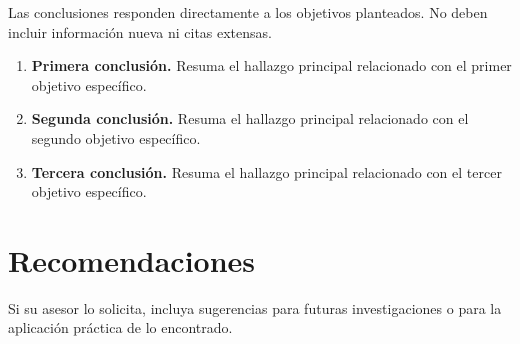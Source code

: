 
Las conclusiones responden directamente a los objetivos planteados. No deben
incluir información nueva ni citas extensas.

\begin{enumerate}[label=\textbf{\arabic*.}]
  \item \textbf{Primera conclusión.} Resuma el hallazgo principal relacionado
        con el primer objetivo específico.
  \item \textbf{Segunda conclusión.} Resuma el hallazgo principal relacionado
        con el segundo objetivo específico.
  \item \textbf{Tercera conclusión.} Resuma el hallazgo principal relacionado
        con el tercer objetivo específico.
\end{enumerate}

\section*{Recomendaciones}

Si su asesor lo solicita, incluya sugerencias para futuras investigaciones o
para la aplicación práctica de lo encontrado.
